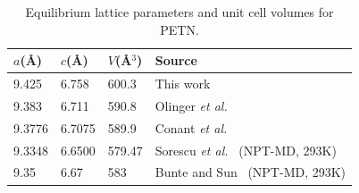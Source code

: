 \documentclass[prb,aps,nobibnotes,superbib,preprint]{revtex4}
\begin{document}
 


\begin{table}[p]
\begin{center}
\begin{tabular}{llll}
\hline\hline
$a$(\AA) & $c$(\AA) & $V$(\AA$^3$) & Source \\
\hline
9.425  & 6.758  &  600.3  & This work \\
9.383  & 6.711  &  590.8  & Olinger {\it et al.}~\cite{Olinger_1975v62}\\
9.3776 & 6.7075 &  589.9  & Conant {\it et al.}~\cite{Conant_1979} \\
9.3348 & 6.6500 &  579.47 & Sorescu {\it et al.}~\cite{Sorescu_1999v103} (NPT-MD, 293K) \\
9.35   & 6.67   &  583    & Bunte and Sun~\cite{Bunte_2000v104} (NPT-MD, 293K) \\
\hline\hline
\end{tabular}
\end{center}
\caption{Equilibrium lattice parameters and unit cell volumes for PETN.
}
\label{tab:table1}
\end{table}
\end{document}
